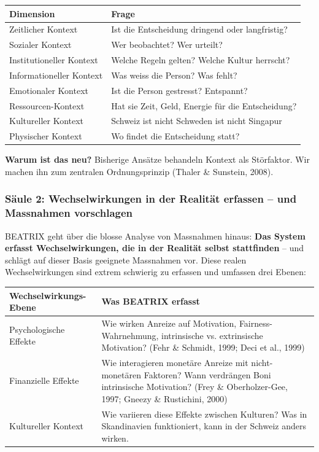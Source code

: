 \documentclass[11pt,a4paper]{article}
\begin{document}
\begin{table}[h]
\centering
\begin{tabular}{@{}L{4cm}L{9cm}@{}}
\toprule
\textbf{Dimension} & \textbf{Frage} \\
\midrule
Zeitlicher Kontext & Ist die Entscheidung dringend oder langfristig? \\
Sozialer Kontext & Wer beobachtet? Wer urteilt? \\
Institutioneller Kontext & Welche Regeln gelten? Welche Kultur herrscht? \\
Informationeller Kontext & Was weiss die Person? Was fehlt? \\
Emotionaler Kontext & Ist die Person gestresst? Entspannt? \\
Ressourcen-Kontext & Hat sie Zeit, Geld, Energie für die Entscheidung? \\
Kultureller Kontext & Schweiz ist nicht Schweden ist nicht Singapur \\
Physischer Kontext & Wo findet die Entscheidung statt? \\
\bottomrule
\end{tabular}
\end{table}

\textbf{Warum ist das neu?} Bisherige Ansätze behandeln Kontext als Störfaktor. Wir machen ihn zum zentralen Ordnungsprinzip (Thaler \& Sunstein, 2008).

\subsubsection{Säule 2: Wechselwirkungen in der Realität erfassen -- und Massnahmen vorschlagen}

BEATRIX geht über die blosse Analyse von Massnahmen hinaus: \textbf{Das System erfasst Wechselwirkungen, die in der Realität selbst stattfinden} -- und schlägt auf dieser Basis geeignete Massnahmen vor. Diese realen Wechselwirkungen sind extrem schwierig zu erfassen und umfassen drei Ebenen:

\begin{table}[h]
\centering
\begin{tabular}{@{}L{4cm}L{9cm}@{}}
\toprule
\textbf{Wechselwirkungs-Ebene} & \textbf{Was BEATRIX erfasst} \\
\midrule
Psychologische Effekte & Wie wirken Anreize auf Motivation, Fairness-Wahrnehmung, intrinsische vs. extrinsische Motivation? (Fehr \& Schmidt, 1999; Deci et al., 1999) \\
Finanzielle Effekte & Wie interagieren monetäre Anreize mit nicht-monetären Faktoren? Wann verdrängen Boni intrinsische Motivation? (Frey \& Oberholzer-Gee, 1997; Gneezy \& Rustichini, 2000) \\
Kultureller Kontext & Wie variieren diese Effekte zwischen Kulturen? Was in Skandinavien funktioniert, kann in der Schweiz anders wirken. \\
\bottomrule
\end{tabular}
\end{table}
\end{document}
